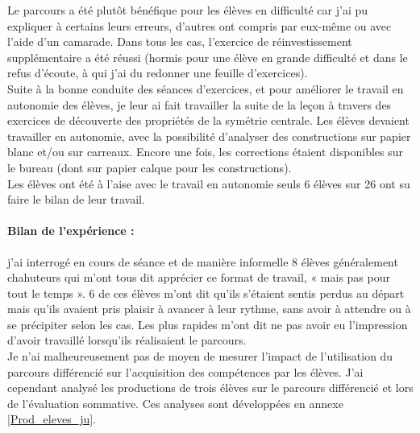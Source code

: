 Le parcours a été plutôt bénéfique pour les élèves en difficulté car j'ai pu expliquer à certains leurs erreurs, d'autres ont compris par eux-même ou avec l'aide d'un camarade. Dans tous les cas, l'exercice de réinvestissement supplémentaire a été réussi (hormis pour une élève en grande difficulté et dans le refus d'écoute, à qui j'ai du redonner une feuille d'exercices).\\
Suite à la bonne conduite des séances d'exercices, et pour améliorer le travail en autonomie des élèves, je leur ai fait travailler la suite de la leçon à travers des exercices de découverte des propriétés de la symétrie centrale. Les élèves devaient travailler en autonomie, avec la possibilité d'analyser des constructions sur papier blanc et/ou sur carreaux. Encore une fois, les corrections étaient disponibles sur le bureau (dont sur papier calque pour les constructions).\\
Les élèves ont été à l'aise avec le travail en autonomie seuls 6 élèves sur 26 ont su faire le bilan de leur travail.

\paragraph{Bilan de l'expérience :}j'ai interrogé en cours de séance et de manière informelle 8 élèves généralement chahuteurs qui m'ont tous dit apprécier ce format de travail, « mais pas pour tout le temps ». 6 de ces élèves m'ont dit qu'ils s'étaient sentis perdus au départ mais qu'ils avaient pris plaisir à avancer à leur rythme, sans avoir  à attendre ou à se précipiter selon les cas. Les plus rapides m'ont dit ne pas avoir eu l'impression d'avoir travaillé lorsqu'ils réalisaient le parcours.\\
Je n'ai malheureusement pas de moyen de mesurer l'impact de l'utilisation du parcours différencié sur l'acquisition des compétences par les élèves. J'ai cependant analysé les productions de trois élèves sur le parcours différencié et lors de l'évaluation sommative. Ces analyses sont développées en annexe \ref{Prod_eleves_ju}.

